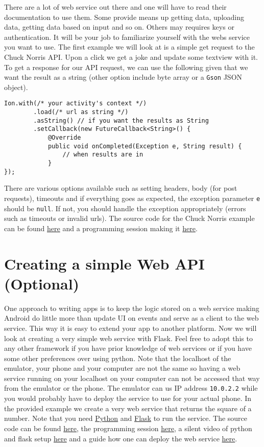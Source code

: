 There are a lot of web service out there and one will have to read their documentation to use them. Some provide means up getting data, uploading data, getting data based on input and so on. Others may requires keys or authentication. It will be your job to familiarize yourself with the webs service you want to use. The first example we will look at is a simple get request to the Chuck Norris API. Upon a click we get a joke and update some textview with it. To get a response for our API request, we can use the following given that we want the result as a string (other option include byte array or a \texttt{Gson} JSON object).
\begin{lstlisting}[style=A_Java]
Ion.with(/* your activity's context */)
        .load(/* url as string */)
        .asString() // if you want the results as String
        .setCallback(new FutureCallback<String>() {
            @Override
            public void onCompleted(Exception e, String result) {
                // when results are in
            }
});
\end{lstlisting}
There are various options available such as setting headers, body (for post requests), timeouts and if everything goes as expected, the exception parameter \texttt{e} should be \texttt{null}. If not, you should handle the exception appropriately (errors such as timeouts or invalid urls). The source code for the Chuck Norris example can be found \href{https://github.com/JonSteinn/AndroidDevelopment/tree/master/examples/lab4/chucknorris}{here} and a programming session making it \href{https://youtu.be/PS8CxRP2XjA}{here}.\\


\section{Creating a simple Web API (Optional)}
One approach to writing apps is to keep the logic stored on a web service making Android do little more than update UI on events and serve as a client to the web service. This way it is easy to extend your app to another platform. Now we will look at creating a very simple web service with Flask. Feel free to adopt this to any other framework if you have prior knowledge of web services or if you have some other preferences over using python. Note that the localhost of the emulator, your phone and your computer are not the same so having a web service running on your localhost on your computer can not be accessed that way from the emulator or the phone. The emulator can us IP address \texttt{10.0.2.2} while you would probably have to deploy the service to use for your actual phone. In the provided example we create a very web service that returns the square of a number. Note that you need \href{https://www.python.org/downloads/}{Python} and \href{http://flask.pocoo.org}{Flask} to run the service. The source code can be found \href{https://github.com/JonSteinn/AndroidDevelopment/tree/master/examples/lab4/squarenumber}{here}, the programming session \href{https://youtu.be/3i2AVI5w6VE}{here}, a silent video of python and flask setup \href{https://youtu.be/8Z4pielSO70}{here} and a guide how one can deploy the web service \href{https://youtu.be/d15uchNJhak}{here}.

